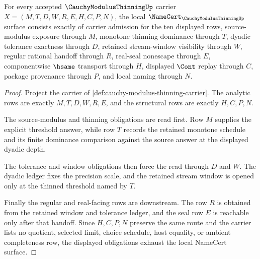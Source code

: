 \begin{theorem}
\label{thm:cauchy-modulus-thinning-namecert-obligations}
For every accepted $\CauchyModulusThinningUp$ carrier $X=(M,T,D,W,R,E,H,C,P,N)$, the local $\NameCert_{\CauchyModulusThinningUp}$ surface consists exactly of carrier admission for the ten displayed rows, source-modulus exposure through $M$, monotone thinning dominance through $T$, dyadic tolerance exactness through $D$, retained stream-window visibility through $W$, regular rational handoff through $R$, real-seal nonescape through $E$, componentwise $\hsame$ transport through $H$, displayed $\Cont$ replay through $C$, package provenance through $P$, and local naming through $N$.
\end{theorem}
\begin{proof}
Project the carrier of \autoref{def:cauchy-modulus-thinning-carrier}. The analytic rows are exactly $M,T,D,W,R,E$, and the structural rows are exactly $H,C,P,N$.

The source-modulus and thinning obligations are read first. Row $M$ supplies the explicit threshold answer, while row $T$ records the retained monotone schedule and its finite dominance comparison against the source answer at the displayed dyadic depth.

The tolerance and window obligations then force the read through $D$ and $W$. The dyadic ledger fixes the precision scale, and the retained stream window is opened only at the thinned threshold named by $T$.

Finally the regular and real-facing rows are downstream. The row $R$ is obtained from the retained window and tolerance ledger, and the seal row $E$ is reachable only after that handoff. Since $H,C,P,N$ preserve the same route and the carrier lists no quotient, selected limit, choice schedule, host equality, or ambient completeness row, the displayed obligations exhaust the local NameCert surface.
\end{proof}

